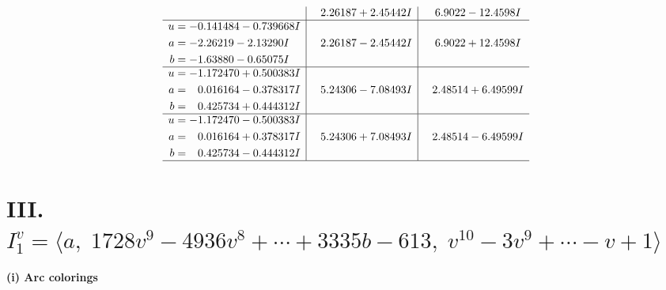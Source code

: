 \documentclass[1p]{elsarticle_modified}
\theoremstyle{definition}
\begin{document}
$$\begin{array}{c|c|c}
 & \phantom{-}2.26187 + 2.45442 I & \phantom{-}6.9022 - 12.4598 I \\ \hline\begin{aligned}
u &= -0.141484 - 0.739668 I \\
a &= -2.26219 - 2.13290 I \\
b &= -1.63880 - 0.65075 I\end{aligned}
 & \phantom{-}2.26187 - 2.45442 I & \phantom{-}6.9022 + 12.4598 I \\ \hline\begin{aligned}
u &= -1.172470 + 0.500383 I \\
a &= \phantom{-}0.016164 - 0.378317 I \\
b &= \phantom{-}0.425734 + 0.444312 I\end{aligned}
 & \phantom{-}5.24306 - 7.08493 I & \phantom{-}2.48514 + 6.49599 I \\ \hline\begin{aligned}
u &= -1.172470 - 0.500383 I \\
a &= \phantom{-}0.016164 + 0.378317 I \\
b &= \phantom{-}0.425734 - 0.444312 I\end{aligned}
 & \phantom{-}5.24306 + 7.08493 I & \phantom{-}2.48514 - 6.49599 I\\
 \hline 
 \end{array}$$\newpage\newpage\renewcommand{\arraystretch}{1}
\centering \section*{III. $I^v_{1}= \langle a,\;1728 v^9-4936 v^8+\cdots+3335 b-613,\;v^{10}-3 v^9+\cdots- v+1 \rangle$}
\flushleft \textbf{(i) Arc colorings}\\
\end{document}
